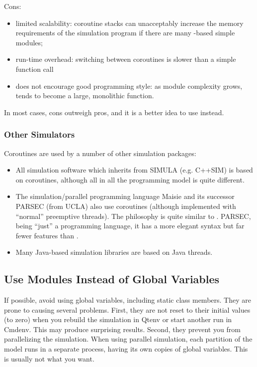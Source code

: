 Cons:
\begin{itemize}
   \item limited scalability: coroutine stacks can unacceptably increase the
       memory requirements of the simulation program if there are many
       -based simple modules;
   \item run-time overhead: switching between coroutines is slower than
       a simple function call
   \item does not encourage good programming style: as module complexity
       grows,  tends to become a large, monolithic function.
\end{itemize}

In most cases, cons outweigh pros, and it is a better idea to use
 instead.


\subsubsection{Other Simulators}
\label{sec:simple-modules:activity:other-simulators}

Coroutines are used by a number of other simulation packages:
\begin{itemize}
\item All simulation software which inherits from SIMULA (e.g. C++SIM)
    is based on coroutines, although all in all the programming
    model is quite different.
\item The simulation/parallel programming language Maisie and its successor
    PARSEC (from UCLA) also use coroutines (although implemented
    with ``normal'' preemptive threads). The philosophy
    is quite similar to {\opp}. PARSEC, being ``just''
    a programming language, it has a more elegant syntax but far fewer
    features than {\opp}.
\item Many Java-based simulation libraries are based on Java
    threads.
\end{itemize}

\subsection{Use Modules Instead of Global Variables}
\label{sec:simple-modules:global-vars}

If possible, avoid using global variables, including
static class members. They are prone to causing several problems.
First, they are not reset to their initial values (to zero)
when you rebuild the simulation in Qtenv or start another run
in Cmdenv. This may produce surprising results.
Second, they prevent you from parallelizing the simulation.
When using parallel simulation, each partition of the model
runs in a separate process, having its own copies of
global variables. This is usually not what you want.

